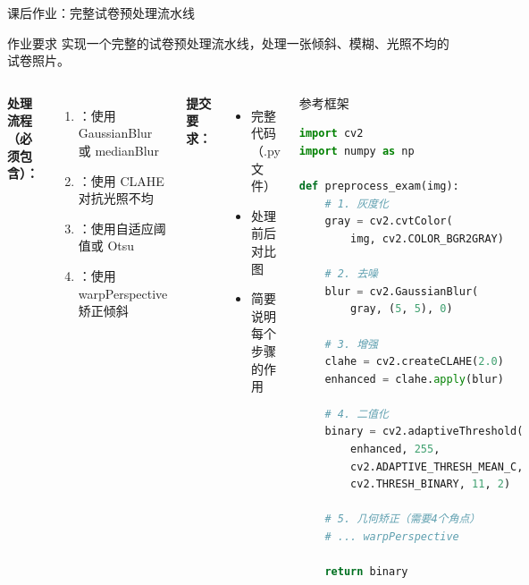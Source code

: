 
\begin{frame}[fragile]{课后作业：完整试卷预处理流水线}
    \begin{alertblock}{作业要求}
        实现一个完整的试卷预处理流水线，处理一张倾斜、模糊、光照不均的试卷照片。
    \end{alertblock}

    \begin{columns}
        \textbf{处理流程（必须包含）：}
        \begin{enumerate}
            \item {}：使用 GaussianBlur 或 medianBlur
            \item {}：使用 CLAHE 对抗光照不均
            \item {}：使用自适应阈值或 Otsu
            \item {}：使用 warpPerspective 矫正倾斜
        \end{enumerate}

        \vspace{0.3cm}
        \textbf{提交要求：}
        \begin{itemize}
            \item 完整代码（.py 文件）
            \item 处理前后对比图
            \item 简要说明每个步骤的作用
        \end{itemize}

        \begin{block}{参考框架}
            \begin{lstlisting}[language=Python, basicstyle=\ttfamily\tiny]
import cv2
import numpy as np

def preprocess_exam(img):
    # 1. 灰度化
    gray = cv2.cvtColor(
        img, cv2.COLOR_BGR2GRAY)

    # 2. 去噪
    blur = cv2.GaussianBlur(
        gray, (5, 5), 0)

    # 3. 增强
    clahe = cv2.createCLAHE(2.0)
    enhanced = clahe.apply(blur)

    # 4. 二值化
    binary = cv2.adaptiveThreshold(
        enhanced, 255,
        cv2.ADAPTIVE_THRESH_MEAN_C,
        cv2.THRESH_BINARY, 11, 2)

    # 5. 几何矫正（需要4个角点）
    # ... warpPerspective

    return binary
            \end{lstlisting}
        \end{block}
    \end{columns}
\end{frame}

